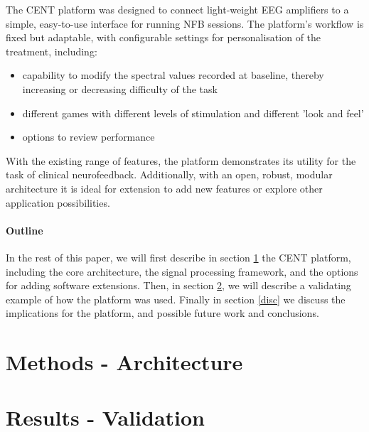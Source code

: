\documentclass[fleqn,10pt]{wlpeerj}
\begin{document}
The CENT platform was designed to connect light-weight EEG amplifiers to a simple, easy-to-use interface for running NFB sessions. The platform's workflow is fixed but adaptable, with configurable settings for personalisation of the treatment, including:
\begin{itemize}
	\item capability to modify the spectral values recorded at baseline, thereby increasing or decreasing difficulty of the task
	\item different games with different levels of stimulation and different 'look and feel'
	\item options to review performance
\end{itemize}

With the existing range of features, the platform demonstrates its utility for the task of clinical neurofeedback. Additionally, with an open, robust, modular architecture it is ideal for extension to add new features or explore other application possibilities.

\paragraph{Outline}
In the rest of this paper, we will first describe in section \ref{methods} the CENT platform, including the core architecture, the signal processing framework, and the options for adding software extensions. Then, in section \ref{cent:trial}, we will describe a validating example of how the platform was used. Finally in section \ref{disc} we discuss the implications for the platform, and possible future work and conclusions.



\section{Methods - Architecture}
\label{methods}











\section{Results - Validation}
\label{cent:trial}
\end{document}
